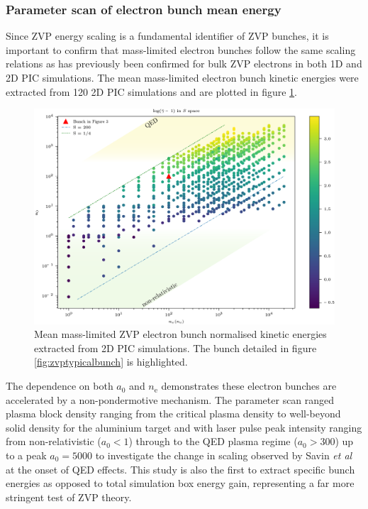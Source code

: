 \subsubsection{Parameter scan of electron bunch mean energy}
Since ZVP energy scaling is a fundamental identifier of ZVP bunches, it is important to confirm that mass-limited electron bunches follow the same scaling relations as has previously been confirmed for bulk ZVP electrons in both 1D \cite{baevaZeroVectorPotential2011} and 2D \cite{savinAttosecondscaleAbsorptionExtreme2017} PIC simulations. The mean mass-limited electron bunch kinetic energies were extracted from 120 2D PIC simulations and are plotted in figure \ref{fig:zvpmeangammas}. 
\begin{figure}
	\centering
	\includegraphics[width=1\linewidth]{figures/zvp/zvp_mean_gammas}
	\caption[Mean mass-limited ZVP electron bunch normalised kinetic energies extracted from 2D PIC simulations.]{Mean mass-limited ZVP electron bunch normalised kinetic energies extracted from 2D PIC simulations. The bunch detailed in figure \ref{fig:zvptypicalbunch} is highlighted.}
	\label{fig:zvpmeangammas}
\end{figure}
The dependence on both $a_0$ and $n_\mathrm{e}$ demonstrates these electron bunches are accelerated by a non-pondermotive mechanism. The parameter scan ranged plasma block density ranging from the critical plasma density to well-beyond solid density for the aluminium target and with laser pulse peak intensity ranging from non-relativistic ($a_0 < 1$) through to the \ac{QED} plasma regime ($a_0 > 300$) up to a peak $a_0 = 5000$ to investigate the change in scaling observed by Savin \textit{et al} \cite{savinEnergyAbsorptionLaserQED2019} at the onset of QED effects. This study is also the first to extract specific bunch energies as opposed to total simulation box energy gain, representing a far more stringent test of ZVP theory.

